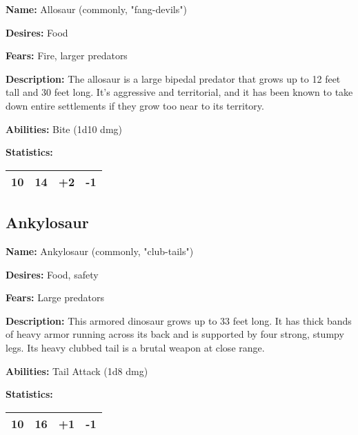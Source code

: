 \begin{multicols}{2}
\textbf{Name:} Allosaur (commonly, "fang-devils") 

\textbf{Desires:} Food

\textbf{Fears:} Fire, larger predators

\textbf{Description:} The allosaur is a large bipedal predator that grows up to
12 feet tall and 30 feet long. It's aggressive and territorial, and it has been
known to take down entire settlements if they grow too near to its territory.

\textbf{Abilities:} Bite (1d10 dmg)

\textbf{Statistics:}

\begin{center}
{
\begin{xtabular}{|l|l|l|l|}
10 & 14 & +2 & -1 \\
\hline
\end{xtabular}
}
\end{center}

\subsection{Ankylosaur}

\textbf{Name:} Ankylosaur (commonly, "club-tails") 

\textbf{Desires:} Food, safety

\textbf{Fears:} Large predators

\textbf{Description:} This armored dinosaur grows up to 33 feet long. It has thick bands
of heavy armor running across its back and is supported by four strong, stumpy legs. Its
heavy clubbed tail is a brutal weapon at close range.

\textbf{Abilities:} Tail Attack (1d8 dmg)

\textbf{Statistics:}

\begin{center}
{
\begin{xtabular}{|l|l|l|l|}
10 & 16 & +1 & -1 \\
\hline
\end{xtabular}
}
\end{center}


\end{multicols}
